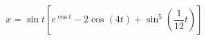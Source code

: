 \documentclass[preview]{standalone}
\begin{document}
\begin{align*}
x = \sin t \left[e^{\cos t}-2\cos \left( 4t \right) + \sin^5 \left(\dfrac{1}{12}t\right) \right]
\end{align*}
\end{document}

